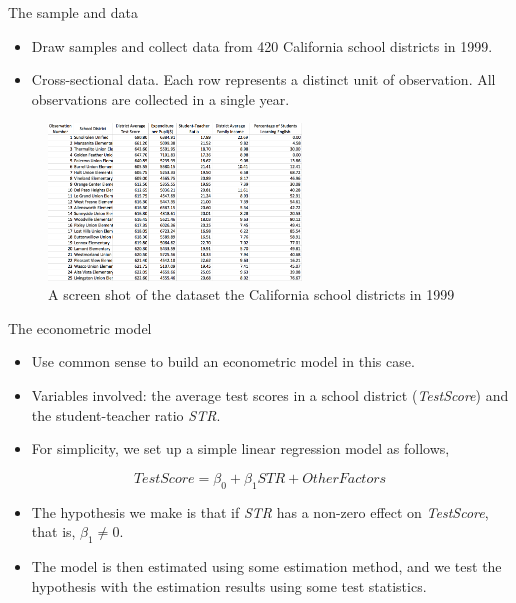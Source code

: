 \documentclass[presentation]{beamer}
\begin{document}
\begin{frame}[label={sec:org31501ee}]{The sample and data}
\begin{itemize}
\item Draw samples and collect data from 420 California school districts
in 1999.
\item Cross-sectional data. Each row represents a distinct unit of
observation. All observations are collected in a single year.
\end{itemize}

\begin{figure}[htbp]
\centering
\includegraphics[width=0.6\textwidth,height=0.5\textheight]{figure/table1_1.png}
\caption{\label{fig:orgb4c8e1f}
A screen shot of the dataset the California school districts in 1999}
\end{figure}
\end{frame}

\begin{frame}[label={sec:org509ac96}]{The econometric model}
\begin{itemize}
\item Use common sense to build an econometric model in this case.
\item Variables involved: the average test scores in a school district
(\emph{TestScore}) and the student-teacher ratio \emph{STR}.
\item For simplicity, we set up a \alert{simple linear regression
model} as follows,
\end{itemize}

\[ TestScore = \beta_0 + \beta_1 STR + OtherFactors  \]

\begin{itemize}
\item The hypothesis we make is that if \emph{STR} has a non-zero effect on
\emph{TestScore}, that is, \(\beta_1 \neq 0\).

\item The model is then estimated using some estimation method, and we
test the hypothesis with the estimation results using some test
statistics.
\end{itemize}
\end{frame}
\end{document}
